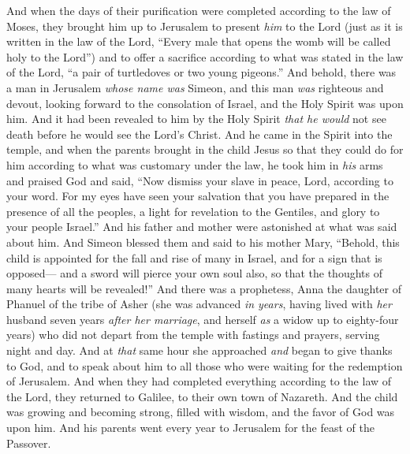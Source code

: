 \begin{biblechapter}
 And when the days of their purification were completed according to the law of Moses, they brought him up to Jerusalem to present \textit{him} to the Lord
\verse (just as it is written in the law of the Lord, “Every male that opens the womb will be called holy to the Lord”)
\verse and to offer a sacrifice according to what was stated in the law of the Lord, “a pair of turtledoves or two young pigeons.”
 And behold, there was a man in Jerusalem \textit{whose name was} Simeon, and this man \textit{was} righteous and devout, looking forward to the consolation of Israel, and the Holy Spirit was upon him.
\verse And it had been revealed to him by the Holy Spirit \textit{that he would} not see death before he would see the Lord’s Christ.
\verse And he came in the Spirit into the temple, and when the parents brought in the child Jesus so that they could do for him according to what was customary under the law,
\verse he took him in \textit{his} arms and praised God and said,
\verse “Now dismiss your slave in peace, Lord, 
according to your word.
\verse For my eyes have seen your salvation
\verse that you have prepared in the presence of all the peoples,
\verse a light for revelation to the Gentiles, 
and glory to your people Israel.”
\verse And his father and mother were astonished at what was said about him.
\verse And Simeon blessed them and said to his mother Mary, “Behold, this child is appointed for the fall and rise of many in Israel, and for a sign that is opposed—
\verse and a sword will pierce your own soul also, so that the thoughts of many hearts will be revealed!”
 And there was a prophetess, Anna the daughter of Phanuel of the tribe of Asher (she was advanced \textit{in years}, having lived with \textit{her} husband seven years \textit{after her marriage},
\verse and herself \textit{as} a widow up to eighty-four years) who did not depart from the temple with fastings and prayers, serving night and day.
\verse And at \textit{that} same hour she approached \textit{and} began to give thanks to God, and to speak about him to all those who were waiting for the redemption of Jerusalem.
\verse And when they had completed everything according to the law of the Lord, they returned to Galilee, to their own town of Nazareth.
\verse And the child was growing and becoming strong, filled with wisdom, and the favor of God was upon him.
 And his parents went every year to Jerusalem for the feast of the Passover.

\end{biblechapter}
